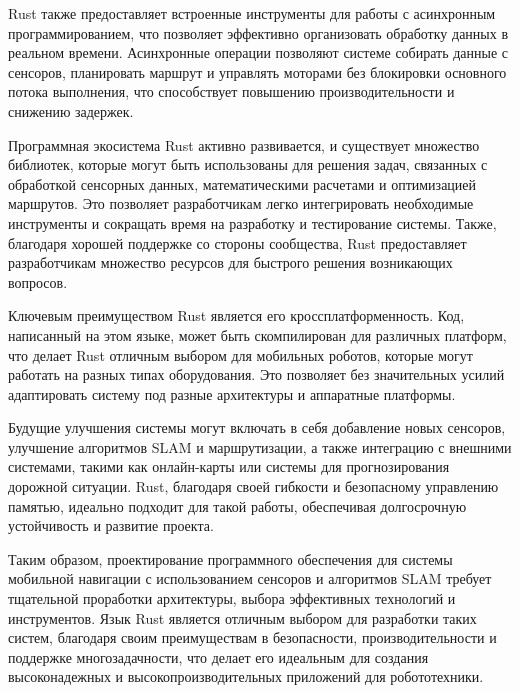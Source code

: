 Rust также предоставляет встроенные инструменты для работы с асинхронным
программированием, что позволяет эффективно организовать обработку данных в
реальном времени. Асинхронные операции позволяют системе собирать данные с
сенсоров, планировать маршрут и управлять моторами без блокировки основного
потока выполнения, что способствует повышению производительности и снижению
задержек.

Программная экосистема Rust активно развивается, и существует множество
библиотек, которые могут быть использованы для решения задач, связанных с
обработкой сенсорных данных, математическими расчетами и оптимизацией маршрутов.
Это позволяет разработчикам легко интегрировать необходимые инструменты и
сокращать время на разработку и тестирование системы. Также, благодаря хорошей
поддержке со стороны сообщества, Rust предоставляет разработчикам множество
ресурсов для быстрого решения возникающих вопросов.

Ключевым преимуществом Rust является его кроссплатформенность. Код, написанный
на этом языке, может быть скомпилирован для различных платформ, что делает Rust
отличным выбором для мобильных роботов, которые могут работать на разных типах
оборудования. Это позволяет без значительных усилий адаптировать систему под
разные архитектуры и аппаратные платформы.

Будущие улучшения системы могут включать в себя добавление новых сенсоров,
улучшение алгоритмов SLAM и маршрутизации, а также интеграцию с внешними
системами, такими как онлайн-карты или системы для прогнозирования дорожной
ситуации. Rust, благодаря своей гибкости и безопасному управлению памятью,
идеально подходит для такой работы, обеспечивая долгосрочную устойчивость и
развитие проекта.

Таким образом, проектирование программного обеспечения для системы мобильной
навигации с использованием сенсоров и алгоритмов SLAM требует тщательной
проработки архитектуры, выбора эффективных технологий и инструментов. Язык Rust
является отличным выбором для разработки таких систем, благодаря своим
преимуществам в безопасности, производительности и поддержке многозадачности,
что делает его идеальным для создания высоконадежных и высокопроизводительных
приложений для робототехники.

